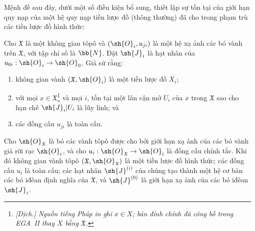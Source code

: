 \documentclass[oneside]{amsart}
\makeatletter
\newcommand{\ega@arrow}[2]{\mathchoice{#1}{#2}{#2}{#2}}
\renewcommand{\to}{\ega@arrow{\longrightarrow}{\rightarrow}}
\newcommand{\oldpage}[2][]{{\marginnote{\normalfont\textbf{#1}~|~#2}}\ignorespaces}
\let\EGAOriginalLabel\label
\renewcommand{\label}[1]{\phantomsection\EGAOriginalLabel{#1}}
\makeatother
\begin{document}
Mệnh đề sau đây, dưới một số điều kiện bổ sung, thiết lập sự tồn tại của giới hạn quy nạp của một hệ quy nạp tiền lược đồ (thông thường) đã cho trong phạm trù các tiền lược đồ hình thức:
\begin{proposition}[10.6.3]
\label{I.10.6.3}
Cho $\mathfrak{X}$ là một không gian tôpô và $(\sh{O}_i,u_{ji})$ là một hệ xạ ảnh các bó vành trên $\mathfrak{X}$, với tập chỉ số là $\bb{N}$.
Đặt $\sh{J}_i$ là hạt nhân của $u_{0i}:\sh{O}_i\to\sh{O}_0$.
Giả sử rằng:
\begin{enumerate}
  \item[\rm{(a)}] không gian vành $(\mathfrak{X},\sh{O}_i)$ là một tiền lược đồ $X_i$;
  \item[\rm{(b)}] với mọi $x\in\mathfrak{X}$\footnote{\emph{[Dịch.] Nguồn tiếng Pháp in ghi $x\in X$; bản đính chính đã công bố trong EGA~II thay $X$ bằng $\mathfrak{X}$.}} và mọi $i$, tồn tại một lân cận mở $U_i$ của $x$ trong $\mathfrak{X}$ sao cho hạn chế $\sh{J}_i|U_i$ là lũy linh; và
  \item[\rm{(c)}] các đồng cấu $u_{ji}$ là toàn cấu.
\end{enumerate}

\oldpage[I]{190}
Cho $\sh{O}_\mathfrak{X}$ là bó các vành tôpô được cho bởi giới hạn xạ ảnh của các bó vành giả rời rạc $\sh{O}_i$, và cho $u_i:\sh{O}_\mathfrak{X}\to\sh{O}_i$ là đồng cấu chính tắc.
Khi đó không gian vành tôpô $(\mathfrak{X},\sh{O}_\mathfrak{X})$ là một tiền lược đồ hình thức; các đồng cấu $u_i$ là toàn cấu; các hạt nhân $\sh{J}^{(i)}$ của chúng tạo thành một hệ cơ bản các bó iđêan định nghĩa của $\mathfrak{X}$, và $\sh{J}^{(0)}$ là giới hạn xạ ảnh của các bó iđêan $\sh{J}_i$.
\end{proposition}
\end{document}
